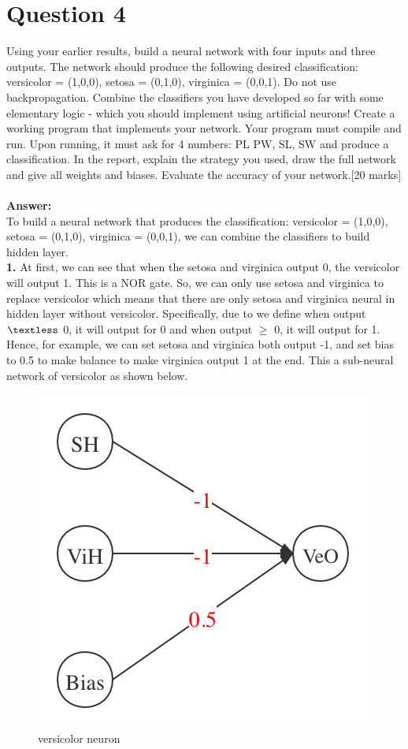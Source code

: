\documentclass{article}
\begin{document}
\section{Question 4}
Using your earlier results, build a neural network with four inputs and three outputs. The network should produce the following desired classification: versicolor = (1,0,0), setosa = (0,1,0), virginica = (0,0,1). Do not use backpropagation. Combine the classifiers you have developed so far with some elementary logic - which you should implement using artificial neurons! Create a working program that implements your network. Your program must compile and run. Upon running, it must ask for 4 numbers: PL PW, SL, SW and produce a classification. In the report, explain the strategy you used, draw the full network and give all weights and biases. Evaluate the accuracy of your network.[20 marks]\\\\
\textbf{Answer:}\\
To build a neural network that produces the classification: versicolor = (1,0,0), setosa = (0,1,0), virginica = (0,0,1), we can combine the classifiers to build hidden layer. \\
\textbf{1.} At first, we can see that when the setosa and virginica output 0, the versicolor will output 1. This is a NOR gate. So, we can only use setosa and virginica to replace versicolor which means that there are only setosa and virginica neural in hidden layer without versicolor. Specifically, due to we define when output $\textless$ 0, it will output for 0 and when output $\geq$ 0, it will output for 1. Hence, for example, we can set setosa and virginica both output -1, and set bias to 0.5 to make balance to make virginica output 1 at the end. This a sub-neural network of versicolor as shown below. 
\begin{figure}[H]
\centering
\includegraphics[scale=0.3]{./img/VeO.png}
\caption{versicolor neuron}
\end{figure}
\end{document}
